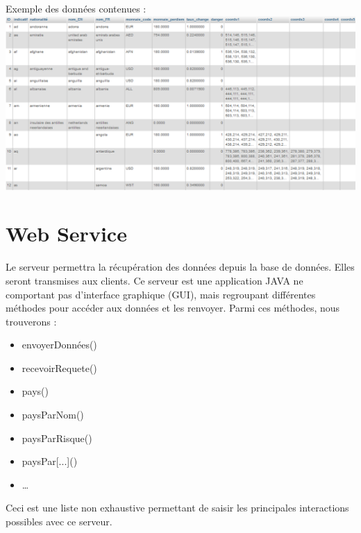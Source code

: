 \documentclass[12pt,a4paper,article]{memoir} %
\begin{document}
Exemple des données contenues :
\break
\includegraphics[scale = 0.4]{images/Image1}


\section{Web Service}
Le serveur permettra la récupération des données depuis la base de données. Elles seront
transmises aux clients.
Ce serveur est une application JAVA ne comportant pas d’interface graphique (GUI), mais
regroupant différentes méthodes pour accéder aux données et les renvoyer. Parmi ces
méthodes, nous trouverons :
\begin{itemize}
\item envoyerDonnées()
\item recevoirRequete()
\item pays()
\item paysParNom()
\item paysParRisque()
\item paysPar[...]()
\item …
\end{itemize}

Ceci est une liste non exhaustive permettant de saisir les principales interactions possibles
avec ce serveur.
\end{document}
